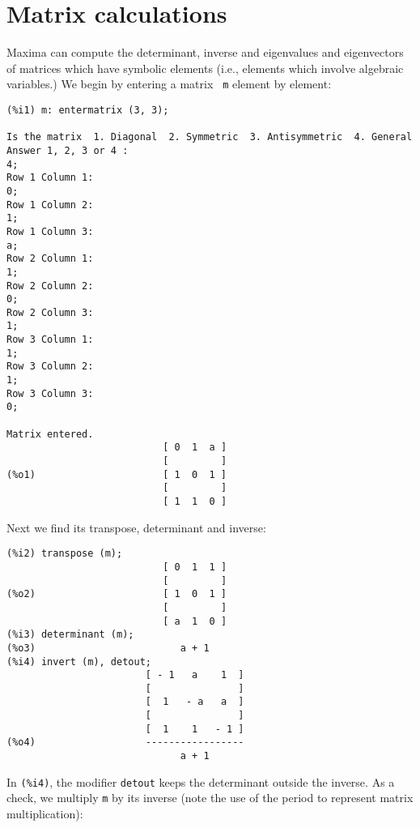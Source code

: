 \documentclass[a4paper,12pt]{article}
\begin{document}
\newpage
\section{Matrix calculations \label{sec:matrix}}

Maxima can compute the determinant, inverse and eigenvalues and
eigenvectors of matrices which have symbolic elements (i.e., elements
which involve algebraic variables.) We begin by entering a matrix {\tt
  m} element by element:
\begin{verbatim}
(%i1) m: entermatrix (3, 3);

Is the matrix  1. Diagonal  2. Symmetric  3. Antisymmetric  4. General
Answer 1, 2, 3 or 4 : 
4;
Row 1 Column 1: 
0;
Row 1 Column 2: 
1;
Row 1 Column 3: 
a;
Row 2 Column 1: 
1;
Row 2 Column 2: 
0;
Row 2 Column 3: 
1;
Row 3 Column 1: 
1;
Row 3 Column 2: 
1;
Row 3 Column 3: 
0;

Matrix entered.
                           [ 0  1  a ]
                           [         ]
(%o1)                      [ 1  0  1 ]
                           [         ]
                           [ 1  1  0 ]
\end{verbatim}
Next we find its transpose, determinant and inverse:
\begin{verbatim}
(%i2) transpose (m);
                           [ 0  1  1 ]
                           [         ]
(%o2)                      [ 1  0  1 ]
                           [         ]
                           [ a  1  0 ]
(%i3) determinant (m);
(%o3)                         a + 1
(%i4) invert (m), detout;
                        [ - 1   a    1  ]
                        [               ]
                        [  1   - a   a  ]
                        [               ]
                        [  1    1   - 1 ]
(%o4)                   -----------------
                              a + 1
\end{verbatim}
In {\tt (\%i4)}, the modifier {\tt detout} keeps the determinant
outside the inverse.  As a check, we multiply {\tt m} by its inverse
(note the use of the period to represent matrix multiplication):
\end{document}
